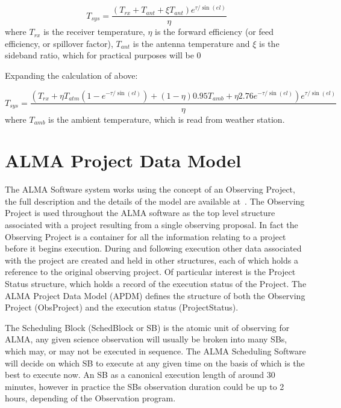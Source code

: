 \begin{enumerate}
$$
T_{sys} = \frac {\left ( T_{rx} + T_{ant} + \xi T_{ant} \right ) e^{\tau / \sin(el)}}
{\eta}
$$
where $T_{rx}$ is the receiver temperature, $\eta$ is the forward efficiency (or
feed efficiency, or spillover factor), $T_{ant}$ is the antenna temperature and $\xi$
is the sideband ratio, which for practical purposes will be $0$

Expanding the calculation of above:

$$
T_{sys} = \frac{\left ( T_{rx} + \eta T_{atm} \left ( 1 - e^{-\tau/\sin(el)} \right ) + (1 - \eta) 0.95 T_{amb} + \eta 2.76 e^{-\tau/\sin(el)} \right )  e^{\tau / \sin(el)}}
{\eta}
$$
where $T_{amb}$ is the ambient temperature, which is read from weather station.
\end{enumerate}


\section{ALMA Project Data Model}
\label{sec:apdm}
The ALMA Software system works using the concept of an Observing Project, the full description and the details of the model are available at~\cite{bridger09}. The Observing Project is used throughout the ALMA software as the top level structure associated with a project resulting from a single observing proposal. In fact the Observing Project is a container for all the information relating to a project before it begins execution. During and following execution other data associated with the project are created and held in other structures, each of which holds a reference to the original observing project. Of particular interest is the Project Status structure, which holds a record of the execution status of the Project. The ALMA Project Data Model (APDM) defines the structure of both the Observing Project (ObsProject) and the execution status (ProjectStatus).

The Scheduling Block (SchedBlock or SB) is the atomic unit of observing for ALMA, any given science observation will usually be broken into many SBs, which may, or may not be executed in sequence. The ALMA Scheduling Software will decide on which SB to execute at any given time on the basis of which is the best to execute now. An SB as a canonical execution length of around 30 minutes, however in practice the SBs observation duration could be up to 2 hours, depending of the Observation program.


